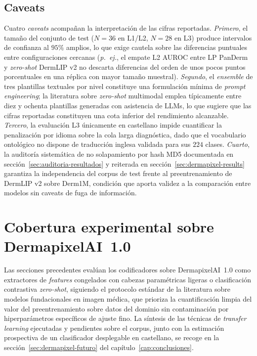\subsection*{Caveats}

Cuatro \emph{caveats} acompañan la interpretación de las cifras
reportadas. \textit{Primero}, el tamaño del conjunto de test
($N = 36$ en L1/L2, $N = 28$ en L3) produce intervalos de
confianza al $95\%$ amplios, lo que exige cautela sobre las
diferencias puntuales entre configuraciones cercanas (\textit{p.~ej.},
el empate L2 AUROC entre LP PanDerm y \emph{zero-shot} DermLIP v2
no descarta diferencias del orden de unos pocos puntos
porcentuales en una réplica con mayor tamaño muestral).
\textit{Segundo}, el \emph{ensemble} de tres plantillas textuales
por nivel constituye una formulación mínima de \emph{prompt
engineering}; la literatura sobre \emph{zero-shot} multimodal
emplea típicamente entre diez y ochenta plantillas generadas con
asistencia de LLMs, lo que sugiere que las cifras reportadas
constituyen una cota inferior del rendimiento alcanzable.
\textit{Tercero}, la evaluación L3 únicamente en castellano impide
cuantificar la penalización por idioma sobre la cola larga
diagnóstica, dado que el vocabulario ontológico no dispone de
traducción inglesa validada para sus $224$ clases.
\textit{Cuarto}, la auditoría sistemática de no solapamiento por
hash MD5 documentada en secci\'on~\ref{sec:auditoria-resultados}
y reiterada en secci\'on~\ref{sec:dermapixel-results} garantiza la
independencia del corpus de test frente al preentrenamiento de
DermLIP v2 sobre Derm1M, condición que aporta validez a la
comparación entre modelos sin caveats de fuga de información.

\section{Cobertura experimental sobre DermapixelAI~1.0}
\label{sec:dermapixel-cobertura}

Las secciones precedentes evalúan los codificadores sobre
DermapixelAI~1.0 como extractores de \emph{features} congelados con
cabezas paramétricas ligeras o clasificación contrastiva
\emph{zero-shot}, siguiendo el protocolo estándar de la literatura
sobre modelos fundacionales en imagen médica, que prioriza la
cuantificación limpia del valor del preentrenamiento sobre datos del
dominio sin contaminación por hiperparámetros específicos de ajuste
fino. La síntesis de las técnicas de \emph{transfer learning}
ejecutadas y pendientes sobre el corpus, junto con la estimación
prospectiva de un clasificador desplegable en castellano, se recoge
en la secci\'on~\ref{sec:dermapixel-futuro} del
capítulo~\ref{cap:conclusiones}.

